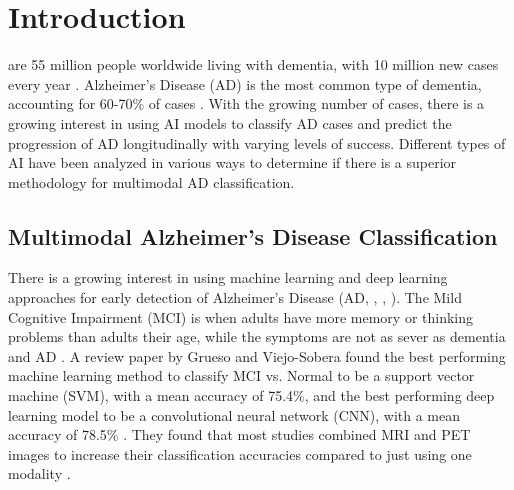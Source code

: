 \section{Introduction}
\label{sec:introduction}
 are 55 million people worldwide living with dementia, with 10 million new cases every year \cite{who_dementia_nodate}. Alzheimer's Disease (AD) is the most common type of dementia, accounting for 60-70\% of cases \cite{who_dementia_nodate}. With the growing number of cases, there is a growing interest in using AI models to classify AD cases and predict the progression of AD longitudinally with varying levels of success. Different types of AI have been analyzed in various ways to determine if there is a superior methodology for multimodal AD classification.


\subsection{Multimodal Alzheimer's Disease Classification}
There is a growing interest in using machine learning and deep learning approaches for early detection of Alzheimer's Disease (AD, \cite{lin_convolutional_2018}, \cite{grueso_machine_2021}, \cite{borchert_artificial_2021}). The Mild Cognitive Impairment (MCI) is when adults have more memory or thinking problems than adults their age, while the symptoms are not as sever as dementia and AD \cite{NationalInstituteOfAging_MildCognitiveImpairment_2024}.   A review paper by Grueso and Viejo-Sobera found the best performing machine learning method to classify MCI vs. Normal to be a support vector machine (SVM), with a mean accuracy of 75.4\%, and the best performing deep learning model to be a convolutional neural network (CNN), with a mean accuracy of 78.5\% \cite{grueso_machine_2021}. They found that most studies combined MRI and PET images to increase their classification accuracies compared to just using one modality \cite{grueso_machine_2021}\cite{borchert_artificial_2021}. 

